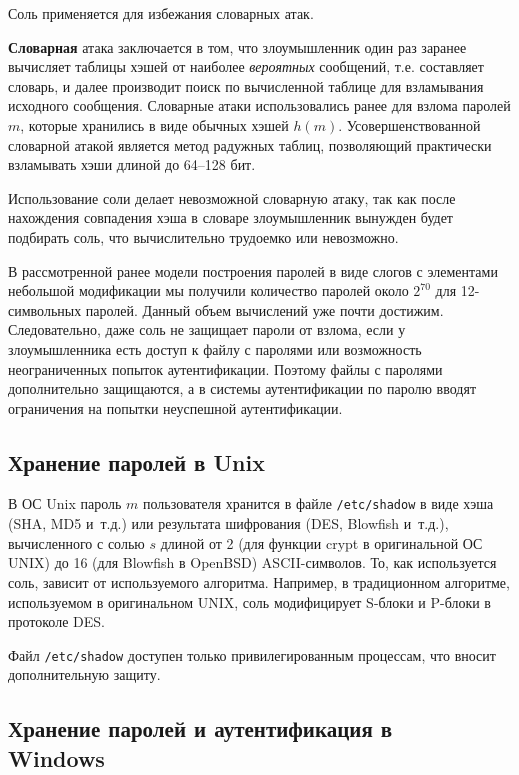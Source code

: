 \documentclass[10pt,a4paper]{book}
\begin{document}
Соль применяется для избежания словарных атак.

\textbf{Словарная} атака заключается в том, что злоумышленник один раз заранее вычисляет таблицы хэшей от наиболее \emph{вероятных} сообщений, т.е. составляет словарь, и далее производит поиск по вычисленной таблице для взламывания исходного сообщения. Словарные атаки использовались ранее для взлома паролей $m$, которые хранились в виде обычных хэшей $h(m)$. Усовершенствованной словарной атакой является метод радужных таблиц, позволяющий практически взламывать хэши длиной до 64--128 бит.

Использование соли делает невозможной словарную атаку, так как после нахождения совпадения хэша в словаре злоумышленник вынужден будет подбирать соль, что вычислительно трудоемко или невозможно.

В рассмотренной ранее модели построения паролей в виде слогов с элементами небольшой модификации мы получили количество паролей около $2^{70}$ для 12-символьных паролей. Данный объем вычислений уже почти достижим. Следовательно, даже соль не защищает пароли от взлома, если у злоумышленника есть доступ к файлу с паролями или возможность неограниченных попыток аутентификации. Поэтому файлы с паролями дополнительно защищаются, а в системы аутентификации по паролю вводят ограничения на попытки неуспешной аутентификации.


\subsection[Unix]{Хранение паролей в Unix}

В ОС Unix пароль $m$ пользователя хранится в файле \texttt{/etc/shadow} в виде хэша (SHA, MD5 и~т.д.) или результата шифрования (DES, Blowfish и~т.д.), вычисленного с солью $s$ длиной от 2 (для функции crypt в оригинальной ОС UNIX) до 16 (для Blowfish в OpenBSD) ASCII-символов.  То, как используется соль, зависит от используемого алгоритма.  Например, в традиционном алгоритме, используемом в оригинальном UNIX, соль модифицирует S-блоки и P-блоки в протоколе DES.

Файл \texttt{/etc/shadow} доступен только привилегированным процессам, что вносит дополнительную защиту.


\subsection[Windows]{Хранение паролей и аутентификация в \protect\\ Windows}
\end{document}
